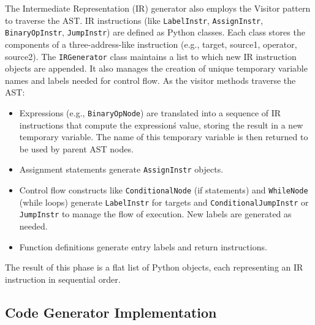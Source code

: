 \documentclass[12pt, letterpaper]{article}
\begin{document}
The Intermediate Representation (IR) generator also employs the Visitor pattern to traverse the AST.\@
IR instructions (like \texttt{LabelInstr}, \texttt{AssignInstr}, \texttt{BinaryOpInstr}, \texttt{JumpInstr}) are defined as Python classes. Each class stores the components of a three-address-like instruction (e.g., target, source1, operator, source2).\@
The \texttt{IRGenerator} class maintains a list to which new IR instruction objects are appended. It also manages the creation of unique temporary variable names and labels needed for control flow.\@
As the visitor methods traverse the AST:
\begin{itemize}
    \item Expressions (e.g., \texttt{BinaryOpNode}) are translated into a sequence of IR instructions that compute the expression\'s value, storing the result in a new temporary variable. The name of this temporary variable is then returned to be used by parent AST nodes.
    \item Assignment statements generate \texttt{AssignInstr} objects.
    \item Control flow constructs like \texttt{ConditionalNode} (if statements) and \texttt{WhileNode} (while loops) generate \texttt{LabelInstr} for targets and \texttt{ConditionalJumpInstr} or \texttt{JumpInstr} to manage the flow of execution. New labels are generated as needed.
    \item Function definitions generate entry labels and return instructions.
\end{itemize}
The result of this phase is a flat list of Python objects, each representing an IR instruction in sequential order.

\subsection*{Code Generator Implementation}
\end{document}
